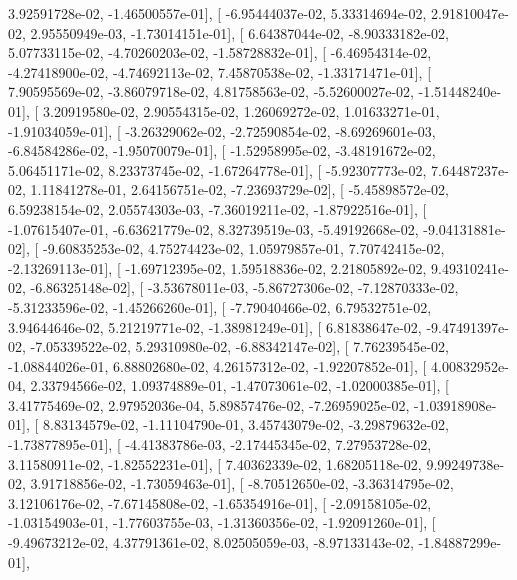 \documentclass{article}
\begin{document}
          3.92591728e-02,  -1.46500557e-01],
       [ -6.95444037e-02,   5.33314694e-02,   2.91810047e-02,
          2.95550949e-03,  -1.73014151e-01],
       [  6.64387044e-02,  -8.90333182e-02,   5.07733115e-02,
         -4.70260203e-02,  -1.58728832e-01],
       [ -6.46954314e-02,  -4.27418900e-02,  -4.74692113e-02,
          7.45870538e-02,  -1.33171471e-01],
       [  7.90595569e-02,  -3.86079718e-02,   4.81758563e-02,
         -5.52600027e-02,  -1.51448240e-01],
       [  3.20919580e-02,   2.90554315e-02,   1.26069272e-02,
          1.01633271e-01,  -1.91034059e-01],
       [ -3.26329062e-02,  -2.72590854e-02,  -8.69269601e-03,
         -6.84584286e-02,  -1.95070079e-01],
       [ -1.52958995e-02,  -3.48191672e-02,   5.06451171e-02,
          8.23373745e-02,  -1.67264778e-01],
       [ -5.92307773e-02,   7.64487237e-02,   1.11841278e-01,
          2.64156751e-02,  -7.23693729e-02],
       [ -5.45898572e-02,   6.59238154e-02,   2.05574303e-03,
         -7.36019211e-02,  -1.87922516e-01],
       [ -1.07615407e-01,  -6.63621779e-02,   8.32739519e-03,
         -5.49192668e-02,  -9.04131881e-02],
       [ -9.60835253e-02,   4.75274423e-02,   1.05979857e-01,
          7.70742415e-02,  -2.13269113e-01],
       [ -1.69712395e-02,   1.59518836e-02,   2.21805892e-02,
          9.49310241e-02,  -6.86325148e-02],
       [ -3.53678011e-03,  -5.86727306e-02,  -7.12870333e-02,
         -5.31233596e-02,  -1.45266260e-01],
       [ -7.79040466e-02,   6.79532751e-02,   3.94644646e-02,
          5.21219771e-02,  -1.38981249e-01],
       [  6.81838647e-02,  -9.47491397e-02,  -7.05339522e-02,
          5.29310980e-02,  -6.88342147e-02],
       [  7.76239545e-02,  -1.08844026e-01,   6.88802680e-02,
          4.26157312e-02,  -1.92207852e-01],
       [  4.00832952e-04,   2.33794566e-02,   1.09374889e-01,
         -1.47073061e-02,  -1.02000385e-01],
       [  3.41775469e-02,   2.97952036e-04,   5.89857476e-02,
         -7.26959025e-02,  -1.03918908e-01],
       [  8.83134579e-02,  -1.11104790e-01,   3.45743079e-02,
         -3.29879632e-02,  -1.73877895e-01],
       [ -4.41383786e-03,  -2.17445345e-02,   7.27953728e-02,
          3.11580911e-02,  -1.82552231e-01],
       [  7.40362339e-02,   1.68205118e-02,   9.99249738e-02,
          3.91718856e-02,  -1.73059463e-01],
       [ -8.70512650e-02,  -3.36314795e-02,   3.12106176e-02,
         -7.67145808e-02,  -1.65354916e-01],
       [ -2.09158105e-02,  -1.03154903e-01,  -1.77603755e-03,
         -1.31360356e-02,  -1.92091260e-01],
       [ -9.49673212e-02,   4.37791361e-02,   8.02505059e-03,
         -8.97133143e-02,  -1.84887299e-01],
\end{document}
